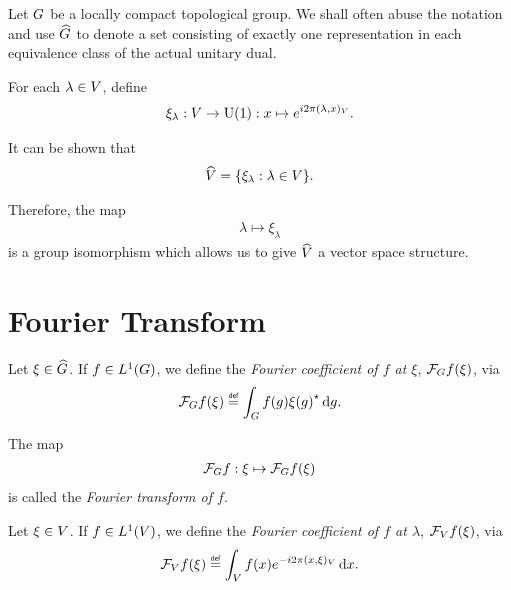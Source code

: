 \begin{remark}
    Let $\Group$ be a locally compact topological group.
    We shall often abuse the notation and use $\dualGroup\Group$ to denote a set consisting of
    exactly one representation in each equivalence class of the actual unitary dual.
\end{remark}

\begin{example}[$\dualGroup\VectorSpace$]
    For each $\lambda \in \VectorSpace$,
    define
    \begin{align}
        \xi_\lambda : \VectorSpace \to \UnitaryGroup{1} : x \mapsto \e^{\i \turn \ip{\lambda}{x}}.
        \label{eq:elements_of_dual_of_vector_space}
    \end{align}

    It can be shown that
    \begin{align*}
        \dualGroup\VectorSpace = \{ \xi_\lambda : \lambda \in \VectorSpace \}.
    \end{align*}

    Therefore, the map
    \begin{align}
        \lambda \mapsto \xi_\lambda
        \label{eq:isomorphism_between_vector_space_and_its_dual_group}
    \end{align}
    is a group isomorphism which allows us to give $\dualGroup\VectorSpace$ a vector space structure.
\end{example}

\section{Fourier Transform}

\begin{definition}
    Let $\xi \in \dualGroup\Group$.
    If $f \in \Lebesgue{1}{\Group}$,
    we define the \emph{Fourier coefficient of $f$ at $\xi$}, $\Fourier f(\xi)$, via
    \begin{align*}
        \Fourier f(\xi) \defeq \int_\Group f(g) \adj{\xi(g)} \dd g.
    \end{align*}

    The map
    \begin{align*}
        \Fourier f : \xi \mapsto \Fourier f(\xi)
    \end{align*}
    is called the \emph{Fourier transform of $f$}.
\end{definition}

\begin{definition}
    Let $\xi \in \VectorSpace$.
    If $f \in \Lebesgue{1}\VectorSpace$,
    we define the \emph{Fourier coefficient of $f$ at $\lambda$}, $\Fourier[\VectorSpace] f(\xi)$, via
    \begin{align*}
        \Fourier[\VectorSpace] f(\xi) \defeq \int_\VectorSpace f(x) \e^{-\i \turn \ip{x}\xi} \dd x.
    \end{align*}
\end{definition}

